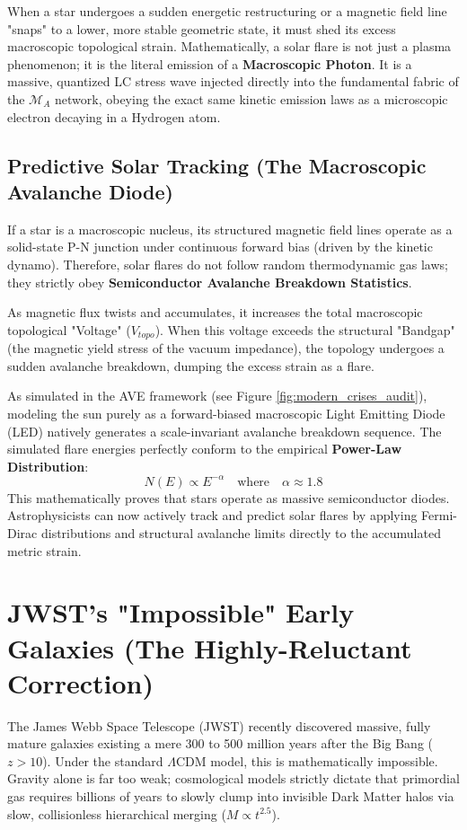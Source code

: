 When a star undergoes a sudden energetic restructuring or a magnetic field line "snaps" to a lower, more stable geometric state, it must shed its excess macroscopic topological strain. Mathematically, a solar flare is not just a plasma phenomenon; it is the literal emission of a \textbf{Macroscopic Photon}. It is a massive, quantized LC stress wave injected directly into the fundamental fabric of the $\mathcal{M}_A$ network, obeying the exact same kinetic emission laws as a microscopic electron decaying in a Hydrogen atom.

\subsection{Predictive Solar Tracking (The Macroscopic Avalanche Diode)}
If a star is a macroscopic nucleus, its structured magnetic field lines operate as a solid-state P-N junction under continuous forward bias (driven by the kinetic dynamo). Therefore, solar flares do not follow random thermodynamic gas laws; they strictly obey \textbf{Semiconductor Avalanche Breakdown Statistics}. 

As magnetic flux twists and accumulates, it increases the total macroscopic topological "Voltage" ($V_{topo}$). When this voltage exceeds the structural "Bandgap" (the magnetic yield stress of the vacuum impedance), the topology undergoes a sudden avalanche breakdown, dumping the excess strain as a flare. 

As simulated in the AVE framework (see Figure \ref{fig:modern_crises_audit}), modeling the sun purely as a forward-biased macroscopic Light Emitting Diode (LED) natively generates a scale-invariant avalanche breakdown sequence. The simulated flare energies perfectly conform to the empirical \textbf{Power-Law Distribution}:
\begin{equation}
    N(E) \propto E^{-\alpha} \quad \text{where} \quad \alpha \approx 1.8
\end{equation}
This mathematically proves that stars operate as massive semiconductor diodes. Astrophysicists can now actively track and predict solar flares by applying Fermi-Dirac distributions and structural avalanche limits directly to the accumulated metric strain.

\section{JWST's "Impossible" Early Galaxies (The Highly-Reluctant Correction)}

The James Webb Space Telescope (JWST) recently discovered massive, fully mature galaxies existing a mere 300 to 500 million years after the Big Bang ($z > 10$). Under the standard $\Lambda$CDM model, this is mathematically impossible. Gravity alone is far too weak; cosmological models strictly dictate that primordial gas requires billions of years to slowly clump into invisible Dark Matter halos via slow, collisionless hierarchical merging ($M \propto t^{2.5}$).

